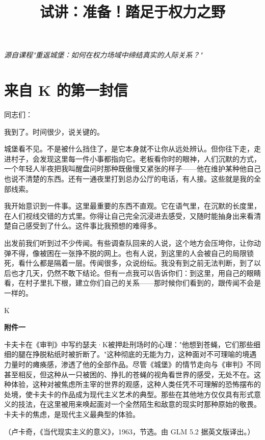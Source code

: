 \documentclass[12pt,a4paper]{article}
\title{\bfseries 试讲：准备！踏足于权力之野}
\author{}
\date{}
\newcommand{\sourcenote}[1]{%
  \par\vspace{0.5em}%
  {\footnotesize\color{gray}（#1）}%
}
\begin{document}
\maketitle
\thispagestyle{fancy}
\vspace{-2em}

\begin{center}
\small\itshape 源自课程"重返城堡：如何在权力场域中缔结真实的人际关系？"
\end{center}

\vspace{1em}

\section{来自 K 的第一封信}

同志们：

我到了。时间很少，说关键的。

城堡看不见。不是被什么挡住了，是它本身就不让你从远处辨认。但你往下走，走进村子，会发现这里每一件小事都指向它。老板看你时的眼神，人们沉默的方式，一个年轻人半夜把我叫醒盘问时那种既傲慢又紧张的样子——他在维护某种他自己也说不清楚的东西。还有一通夜里打到总办公厅的电话，有人接。这些就是我的全部线索。

我开始意识到一件事。这里最重要的东西不直观。它在语气里，在沉默的长度里，在人们视线交错的方式里。你得让自己完全沉浸进去感受，又随时能抽身出来看清楚自己感受到了什么。这件事比我预想的难得多。

出发前我们听到过不少传闻。有些调查队回来的人说，这个地方会压垮你，让你动弹不得，像被困在一张挣不脱的网上。也有人说，到这里的人会被自己的局限锁死，看什么都是隔着一层。传闻很多，众说纷纭。我没有到之前无法判断，到了以后也才几天，仍然不敢下结论。但有一点我可以告诉你们：到这里，用自己的眼睛看，在村子里扎下根，建立你们自己的关系——那时候你们看到的，跟传闻不会是一样的。

\begin{flushright}
K
\end{flushright}

\vspace{1em}
\newpage
{\large\bfseries 附件一}

卡夫卡在《审判》中写约瑟夫·K被押赴刑场时的心理："他想到苍蝇，它们那些细细的腿在挣脱粘纸时被折断了。"这种彻底的无能为力，这种面对不可理喻的境遇力量时的瘫痪感，渗透了他的全部作品。尽管《城堡》的情节走向与《审判》不同甚至相反，但这种从一只被困的、挣扎的苍蝇的视角看世界的感受，无处不在。这种体验，这种对被焦虑所主宰的世界的观感，这种人类任凭不可理解的恐怖摆布的处境，使卡夫卡的作品成为现代主义艺术的典型。那些在其他地方仅仅具有形式意义的技法，在这里被用来唤起面对一个全然陌生和敌意的现实时那种原始的敬畏。卡夫卡的焦虑，是现代主义最典型的体验。
\sourcenote{卢卡奇，《当代现实主义的意义》，1963，节选。由 GLM 5.2 据英文版译出。}
\end{document}
